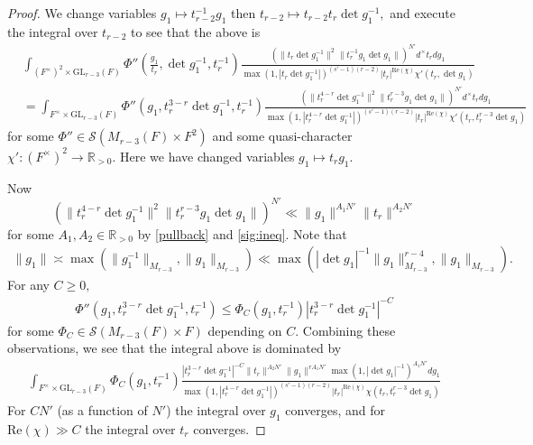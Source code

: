 \documentclass[12pt]{amsart}
\theoremstyle{remark}
\numberwithin{equation}{section}
\newcommand{\GL}{\mathrm{GL}}
\newcommand{\RR}{\mathbb{R}}
\theoremstyle{definition}
\numberwithin{equation}{subsection}
\newcommand{\norm}[1]{\lVert#1\rVert}
\begin{document}
\begin{proof}
We change variables $g_1 \mapsto t_{r-2}^{-1}g_1$ then $t_{r-2} \mapsto t_{r-2} t_r \det g_1^{-1},$ and execute the integral over $t_{r-2}$ to see that the above is
\begin{align} \nonumber
    &\int_{(F^\times)^2 \times \GL_{r-3}(F)}\Phi''\left(\frac{g_1}{t_r}, \det g_1^{-1},t_r^{-1}\right) \frac{(\norm{t_r \det g_1^{-1}}^2\norm{t_r^{-1}g_1\det g_1})^{N'}  d^\times t_{r}dg_1}{\max(1,|t_r\det g_1^{-1}|)^{(s'-1)(r-2)}|t_r|^{\mathrm{Re}(\chi)}\chi'(t_r,\det g_1)}\\
    &=\int_{F^\times \times \GL_{r-3}(F)}\Phi''\left(g_1, t_r^{3-r}\det g_1^{-1},t_r^{-1}\right) \frac{(\norm{t_r^{4-r} \det g_1^{-1}}^2\norm{t_r^{r-3}g_1\det g_1})^{N'}  d^\times t_{r}dg_1}{\max(1,|t_r^{4-r}\det g_1^{-1}|)^{(s'-1)(r-2)}|t_r|^{\mathrm{Re}(\chi)}\chi'(t_r,t_{r}^{r-3}\det g_1)}  \label{before:split}
\end{align}
for some $\Phi'' \in \mathcal{S}(M_{r-3}(F) \times F^2)$ and some quasi-character $\chi':(F^\times)^2 \to \RR_{>0}.$ 
Here we have changed variables $g_1 \mapsto t_rg_1.$

Now
$$
\left(\norm{t_r^{4-r} \det g_1^{-1}}^2\norm{t_r^{r-3}g_1\det g_1}\right)^{N'} \ll \norm{g_1}^{A_1N'}\norm{t_r}^{A_2N'}
$$
for some $A_1,A_2 \in \RR_{>0}$ by  \eqref{pullback} and \eqref{sig:ineq}. Note that
\begin{align*}
    \norm{g_1}\asymp \max(\norm{g_1^{-1}}_{M_{r-3}},\norm{g_1}_{M_{r-3}})\ll \max(|\det g_1|^{-1}\norm{g_1}_{M_{r-3}}^{r-4},\norm{g_1}_{M_{r-3}}).
\end{align*}
For any $C\ge 0,$
\begin{align*}
    \Phi''( g_1, t_{r}^{3-r}\det g_1^{-1}  ,t_{r}^{-1})\le  \Phi_C( g_1,t_{r}^{-1})|t_r^{3-r}\det g_1^{-1}|^{-C}
\end{align*}
for some $\Phi_{C} \in \mathcal{S}(M_{r-3}(F) \times F)$ depending on $C.$ Combining these observations, we see that the integral above is dominated by 
\begin{align}
\int_{F^\times \times \GL_{r-3}(F)}\Phi_C\left(g_1,t_r^{-1}\right) \frac{ |t_r^{3-r}\det g_1^{-1}|^{-C}\norm{t_r}^{A_2N'}\norm{g_1}^{rA_1N'}\max(1,|\det g_1|^{-1})^{A_1N'}dg_1}{\max(1,|t_r^{4-r}\det g_1^{-1}|)^{(s'-1)(r-2)}|t_r|^{\mathrm{Re}(\chi)}\chi(t_r,t_{r}^{r-3}\det g_1)}
\end{align}
For $C N'$  (as a function of $N'$) the integral over $g_1$ converges, and for $\mathrm{Re}(\chi) \gg C$ the integral over $t_r$ converges. 
\end{proof}
\end{document}
